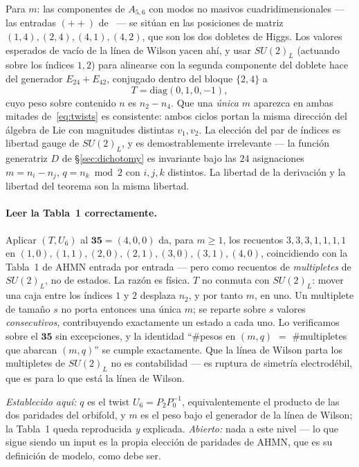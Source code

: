 \documentclass[11pt,a4paper]{article}
\begin{document}
Para $m$: las componentes de $A_{5,6}$ con modos no masivos cuadridimensionales --- las
entradas $(++)$ de~\cite[Ec.~(2.12)]{AHMN} --- se sitúan en las posiciones de matriz
$(1,4),(2,4),(4,1),(4,2)$, que son los dos dobletes de Higgs. Los valores esperados de vacío
de la línea de Wilson yacen ahí, y usar $SU(2)_L$ (actuando sobre los índices $1,2$) para
alinearse con la segunda componente del doblete hace del generador $E_{24}+E_{42}$, conjugado
dentro del bloque $\{2,4\}$ a
\begin{equation}
T=\mathrm{diag}(0,1,0,-1),
\end{equation}
cuyo peso sobre contenido $n$ es $n_2-n_4$. Que una \emph{única} $m$ aparezca en ambas
mitades de~\eqref{eq:twists} es consistente: ambos ciclos portan la misma dirección del
álgebra de Lie con magnitudes distintas $v_1,v_2$. La elección del par de índices es libertad
gauge de $SU(2)_L$, y es demostrablemente irrelevante --- la función generatriz $D$ de
\S\ref{sec:dichotomy} es invariante bajo las $24$ asignaciones $m=n_i-n_j$, $q=n_k\bmod2$ con
$i,j,k$ distintos. La libertad de la derivación y la libertad del teorema son la misma
libertad.

\paragraph{Leer la Tabla~1 correctamente.} Aplicar $(T,U_6)$ al $\mathbf{35}=(4,0,0)$ da,
para $m\ge1$, los recuentos $3,3,3,1,1,1,1$ en $(1,0),(1,1),(2,0),(2,1),(3,0),(3,1),(4,0)$,
coincidiendo con la Tabla~1 de AHMN entrada por entrada --- pero como recuentos de
\emph{multipletes} de $SU(2)_L$, no de estados. La razón es física. $T$ no conmuta con
$SU(2)_L$: mover una caja entre los índices $1$ y $2$ desplaza $n_2$, y por tanto $m$, en
uno. Un multiplete de tamaño $s$ no porta entonces una única $m$; se reparte sobre $s$
valores \emph{consecutivos}, contribuyendo exactamente un estado a cada uno. Lo verificamos
sobre el $\mathbf{35}$ sin excepciones, y la identidad ``\#pesos en $(m,q)$ $=$ \#multipletes
que abarcan $(m,q)$'' se cumple exactamente. Que la línea de Wilson parta los multipletes de
$SU(2)_L$ no es contabilidad --- es ruptura de simetría electrodébil, que es para lo que está
la línea de Wilson.

\emph{Establecido aquí:} $q$ es el twist $U_6=P_2P_0^{-1}$, equivalentemente el producto de
las dos paridades del orbifold, y $m$ es el peso bajo el generador de la línea de Wilson; la
Tabla~1 queda reproducida \emph{y} explicada. \emph{Abierto:} nada a este nivel --- lo que
sigue siendo un input es la propia elección de paridades de AHMN, que es su definición de
modelo, como debe ser.
\end{document}
